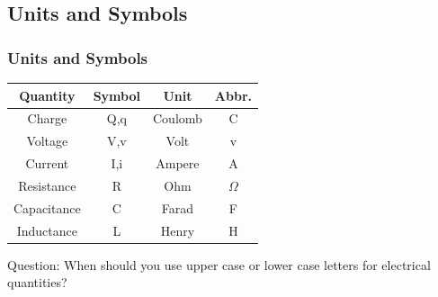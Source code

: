 \documentclass[fleqn]{beamer} %
\newcommand{\sectionIsubsectionIIItitle}{Units and Symbols}
\begin{document}
		\subsection{\sectionIsubsectionIIItitle}\label{sectionIsubsectionIII}
			\begin{frame} 
				\frametitle{\sectionIsubsectionIIItitle}

				\renewcommand{\arraystretch}{1.2}
				\begin{tabular}{|c|c|c|c|} \hline
					Quantity & Symbol & Unit & Abbr. \\ \hline\hline
				    Charge & Q,q & Coulomb & C \\ \hline
				    Voltage & V,v & Volt & v\\ \hline
				    Current & I,i & Ampere & A \\ \hline
				    Resistance & R & Ohm & $\Omega$ \\ \hline
				    Capacitance & C & Farad & F \\ \hline
				    Inductance & L & Henry & H  \\ \hline
				\end{tabular}
				
				\vspace*{10mm} Question: When should you use upper case or lower case letters for electrical quantities?
				
			\end{frame}	
\end{document}
